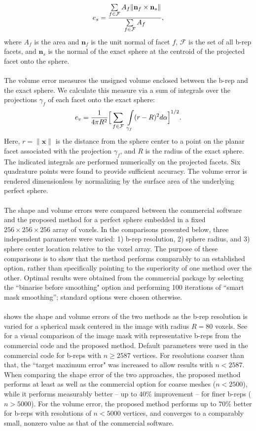 \begin{equation} 
	e_s = \frac{ \sum \limits_{f\in\mathcal{F}} A_f \lVert {\bf n}_f \times {\bf n}_s \rVert}{\sum \limits_{f\in\mathcal{F}} A_f},
\end{equation}
where $A_f$ is the area and ${\bm n}_f$ is the unit normal of facet $f$, $\mathcal{F}$ is the set of all b-rep facets, and ${\bm n}_s$ is the normal of the exact sphere at the centroid of the projected facet onto the sphere. \\ \\
%
The volume error measures the unsigned volume enclosed between the b-rep and the exact sphere. We calculate this measure via a sum of integrals over the projections $\gamma_f$ of each facet onto the exact sphere: 
\begin{equation}
\label{vol err}
	e_v = \frac{1}{4\pi R^2} \Big[\sum \limits_{f \in \mathcal{F}\textsl{}} \ \int \limits_{\gamma_f} (r - R)^2 d\alpha \Big]^{1/2} .
\end{equation}
Here, $r = \lVert {\bm x} \rVert$ is the distance from the sphere center to a point on the planar facet associated with the projection $\gamma_f$, and $R$ is the radius of the exact sphere.  The indicated integrals are performed numerically on the projected facets. Six quadrature points were found to provide sufficient accuracy. The volume error is rendered dimensionless by normalizing by the surface area of the underlying perfect sphere.
\\ \\
%
The shape and volume errors were compared between the commercial software and the proposed method for a perfect sphere embedded in a fixed $256 \times 256 \times 256$ array of voxels.  In the comparisons presented below, three independent parameters were varied:  1) b-rep resolution, 2) sphere radius, and 3) sphere center location relative to the voxel array. The purpose of these comparisons is to show that the method performs comparably to an established option, rather than specifically pointing to the superiority of one method over the other. Optimal results were obtained from the commercial package by selecting the ``binarise before smoothing" option and performing 100 iterations of ``smart mask smoothing''; standard options were chosen otherwise. \\ \\
%
 shows the shape and volume errors of the two methods as the b-rep resolution is varied for a spherical mask centered in the image with radius $R = 80$ voxels. See~ for a visual comparison of the image mask with representative b-reps from the commercial code and the proposed method. Default parameters were used in the commercial code for b-reps with $n \ge 2587$ vertices. For resolutions coarser than that, the ``target maximum error" was increased to allow results with $n < 2587$. When comparing the shape error of the two approaches, the proposed method performs at least as well as the commercial option for coarse meshes ($n < 2500$), while it performs measurably better -- up to $40\%$ improvement -- for finer b-reps ($n > 5000$). For the volume error, the proposed method performs up to $70\%$ better for b-reps with resolutions of $n < 5000$ vertices, and converges to a comparably small, nonzero value as that of the commercial software.
